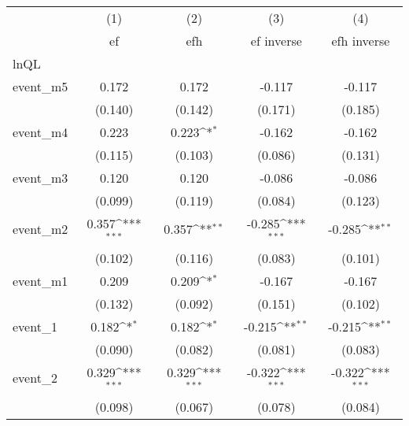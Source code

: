 {
\def\sym#1{\ifmmode^{#1}\else\(^{#1}\)\fi}
\begin{tabular}{l*{4}{c}}
\hline\hline
            &\multicolumn{1}{c}{(1)}&\multicolumn{1}{c}{(2)}&\multicolumn{1}{c}{(3)}&\multicolumn{1}{c}{(4)}\\
            &\multicolumn{1}{c}{ef}&\multicolumn{1}{c}{efh}&\multicolumn{1}{c}{ef inverse}&\multicolumn{1}{c}{efh inverse}\\
\hline
lnQL        &                     &                     &                     &                     \\
event\_m5    &       0.172         &       0.172         &      -0.117         &      -0.117         \\
            &     (0.140)         &     (0.142)         &     (0.171)         &     (0.185)         \\
[1em]
event\_m4    &       0.223         &       0.223\sym{*}  &      -0.162         &      -0.162         \\
            &     (0.115)         &     (0.103)         &     (0.086)         &     (0.131)         \\
[1em]
event\_m3    &       0.120         &       0.120         &      -0.086         &      -0.086         \\
            &     (0.099)         &     (0.119)         &     (0.084)         &     (0.123)         \\
[1em]
event\_m2    &       0.357\sym{***}&       0.357\sym{**} &      -0.285\sym{***}&      -0.285\sym{**} \\
            &     (0.102)         &     (0.116)         &     (0.083)         &     (0.101)         \\
[1em]
event\_m1    &       0.209         &       0.209\sym{*}  &      -0.167         &      -0.167         \\
            &     (0.132)         &     (0.092)         &     (0.151)         &     (0.102)         \\
[1em]
event\_1     &       0.182\sym{*}  &       0.182\sym{*}  &      -0.215\sym{**} &      -0.215\sym{**} \\
            &     (0.090)         &     (0.082)         &     (0.081)         &     (0.083)         \\
[1em]
event\_2     &       0.329\sym{***}&       0.329\sym{***}&      -0.322\sym{***}&      -0.322\sym{***}\\
            &     (0.098)         &     (0.067)         &     (0.078)         &     (0.084)         \\

\end{tabular}}
